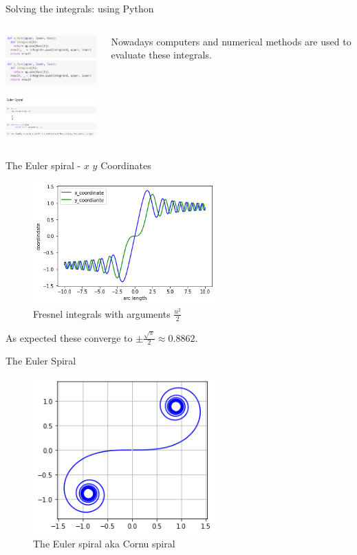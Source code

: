 \documentclass{beamer}
\begin{document}
\begin{frame}{Solving the integrals: using Python}
	\begin{columns}
		\begin{column}{0.5\textwidth}
			\includegraphics[width=50mm, scale=0.5]{code_1.png}
			
			\includegraphics[width=50mm, scale=0.5]{code_2.png}
		\end{column}
		\begin{column}{0.5\textwidth}
		Nowadays computers and numerical methods are used to evaluate these integrals.
		\end{column}
	\end{columns}
\end{frame}

\begin{frame}{The Euler spiral - $x$ $y$ Coordinates}
	\begin{figure}
		\caption{Fresnel integrals with arguments $\frac{u^2}{2}$}
		\centering
		\includegraphics[width=70mm, scale=0.5]{euler_x_vs_y.png}
	\end{figure}
	As expected these converge to $\pm \frac{\sqrt{\pi}}{2} \approx 0.8862$.
\end{frame}

\begin{frame}{The Euler Spiral}
	\begin{figure}
		\caption{The Euler spiral aka Cornu spiral}
		\centering
		\includegraphics[width=70mm, scale=0.5]{euler_spiral.png}
	\end{figure}
	
\end{frame}
\end{document}
